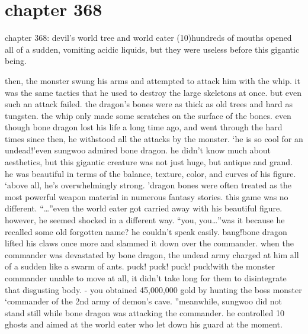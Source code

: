 \section{chapter 368}

chapter 368: devil’s world tree and world eater (10)hundreds of mouths opened all of a sudden, vomiting acidic liquids, but they were useless before this gigantic being.





then, the monster swung his arms and attempted to attack him with the whip.
 it was the same tactics that he used to destroy the large skeletons at once.
 but even such an attack failed.
the dragon’s bones were as thick as old trees and hard as tungsten.
the whip only made some scratches on the surface of the bones.
 even though bone dragon lost his life a long time ago, and went through the hard times since then, he withstood all the attacks by the monster.
‘he is so cool for an undead!’even sungwoo admired bone dragon.
 he didn’t know much about aesthetics, but this gigantic creature was not just huge, but antique and grand.
 he was beautiful in terms of the balance, texture, color, and curves of his figure.
‘above all, he’s overwhelmingly strong.
’dragon bones were often treated as the most powerful weapon material in numerous fantasy stories.
 this game was no different.
“…”even the world eater got carried away with his beautiful figure.
 however, he seemed shocked in a different way.
“you, you…”was it because he recalled some old forgotten name? he couldn’t speak easily.
bang!bone dragon lifted his claws once more and slammed it down over the commander.
 when the commander was devastated by bone dragon, the undead army charged at him all of a sudden like a swarm of ants.
puck! puck! puck! puck!with the monster commander unable to move at all, it didn’t take long for them to disintegrate that disgusting body.
- you obtained 45,000,000 gold by hunting the boss monster ‘commander of the 2nd army of demon’s cave.
”meanwhile, sungwoo did not stand still while bone dragon was attacking the commander.
he controlled 10 ghosts and aimed at the world eater who let down his guard at the moment.

